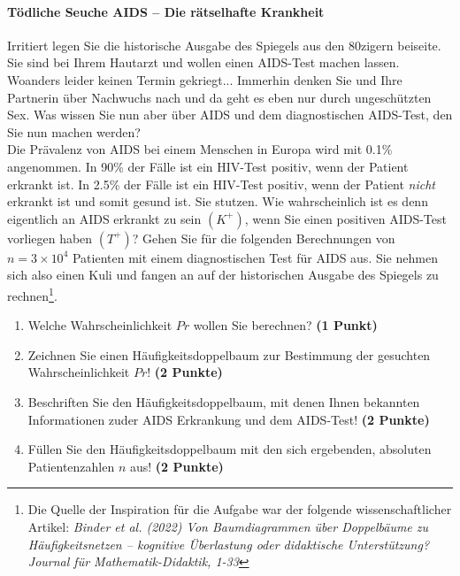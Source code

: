 \documentclass[a4paper, 9pt]{scrartcl}\usepackage[]{graphicx}\usepackage[]{xcolor}
\begin{document}
\paragraph{T{\"o}dliche Seuche AIDS -- Die r{\"a}tselhafte Krankheit}




Irritiert legen Sie die historische Ausgabe des Spiegels aus den 80zigern
beiseite. Sie sind bei Ihrem Hautarzt und wollen einen AIDS-Test machen
lassen. Woanders leider keinen Termin gekriegt... Immerhin denken Sie und
Ihre Partnerin {\"u}ber Nachwuchs nach und da geht es eben nur durch
ungesch{\"u}tzten Sex. Was wissen Sie nun aber {\"u}ber AIDS und dem diagnostischen
AIDS-Test, den Sie nun machen werden?\\

Die Pr{\"a}valenz von AIDS bei einem Menschen in Europa wird mit
0.1\% angenommen. In 90\% der F{\"a}lle ist ein
HIV-Test positiv, wenn der Patient erkrankt ist. In 2.5\%
der F{\"a}lle ist ein HIV-Test positiv, wenn der Patient \textit{nicht}
erkrankt ist und somit gesund ist. Sie stutzen. Wie wahrscheinlich ist es
denn eigentlich an AIDS erkrankt zu sein $(K^+)$, wenn Sie einen positiven
AIDS-Test vorliegen haben $(T^+)$? Gehen Sie f{\"u}r die folgenden Berechnungen
von $n = \ensuremath{3\times 10^{4}}$ Patienten mit einem diagnostischen Test f{\"u}r AIDS
aus. Sie nehmen sich also einen Kuli und fangen an auf der historischen
Ausgabe des Spiegels zu rechnen\footnote{Die Quelle der Inspiration f{\"u}r die
  Aufgabe war der folgende wissenschaftlicher Artikel: \textit{Binder et
    al. (2022) Von Baumdiagrammen {\"u}ber Doppelb{\"a}ume zu H{\"a}ufigkeitsnetzen --
    kognitive {\"U}berlastung oder didaktische Unterst{\"u}tzung? Journal f{\"u}r
    Mathematik-Didaktik, 1-33}}.

\begin{enumerate}
\item Welche Wahrscheinlichkeit $Pr$ wollen Sie berechnen? \textbf{(1 Punkt)}
\item Zeichnen Sie einen H{\"a}ufigkeitsdoppelbaum zur Bestimmung der gesuchten
  Wahrscheinlichkeit $Pr$! \textbf{(2 Punkte)} 
\item Beschriften Sie den H{\"a}ufigkeitsdoppelbaum, mit denen Ihnen bekannten
  Informationen zuder AIDS Erkrankung und dem AIDS-Test! \textbf{(2 Punkte)}
\item F{\"u}llen Sie den H{\"a}ufigkeitsdoppelbaum mit den sich ergebenden,
  absoluten Patientenzahlen $n$ aus! \textbf{(2 Punkte)}
\end{enumerate}
\end{document}
